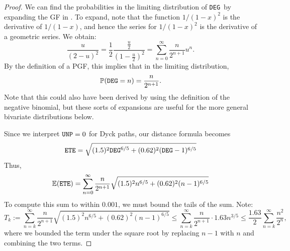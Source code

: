 \documentclass{article}
\newcommand{\DEG}{{\tt DEG}}
\newcommand{\UNP}{{\tt UNP}}
\newcommand{\ETE}{{\tt ETE}}
\begin{document}
\begin{proof}
    We can find the probabilities in the limiting distribution of \DEG\ by expanding the GF in .  To expand, note that the function $1/(1-x)^2$ is the derivative of $1/(1-x)$, and hence the series for $1/(1-x)^2$ is the derivative of a geometric series.  We obtain:
    \[
    \frac{u}{(2-u)^2} = \frac{1}{2} \frac{\frac{u}{2}}{\left(1 - \frac{u}{2}\right)^2} = \sum_{n = 0}^\infty \frac{n}{2^{n + 1}} u^n.
    \]
    By the definition of a PGF, this implies that in the limiting distribution,
    \[
    \mathbb{P}(\DEG = n) = \frac{n}{2^{n + 1}}.
    \]
    Note that this could also have been derived by using the definition of the negative binomial, but these sorts of expansions are useful for the more general bivariate distributions below.

    Since we interpret $\UNP = 0$ for Dyck paths, our distance formula becomes
    \[
    \ETE = \sqrt{(1.5)^2 \DEG^{6/5} + (0.62)^2 (\DEG - 1)^{6/5}}
    \]
    Thus,
    \[
    \mathbb{E}(\ETE) = \sum_{n = 0}^\infty \frac{n}{2^{n + 1}}\sqrt{(1.5)^2 n^{6/5} + (0.62)^2 (n - 1)^{6/5}}
    \]
    To compute this sum to within $0.001$, we must bound the tails of the sum.  Note:
    \[
    T_k := \sum_{n = k}^\infty \frac{n}{2^{n + 1}}\sqrt{(1.5)^2 n^{6/5} + (0.62)^2 (n - 1)^{6/5}} \leq \sum_{n = k}^\infty \frac{n}{2^{n + 1}} \cdot 1.63 n^{3/5} \leq \frac{1.63}{2}\sum_{n = k}^\infty \frac{n^2}{2^n},
    \]
    where we bounded the term under the square root by replacing $n - 1$ with $n$ and combining the two terms.


\end{proof}
\end{document}
